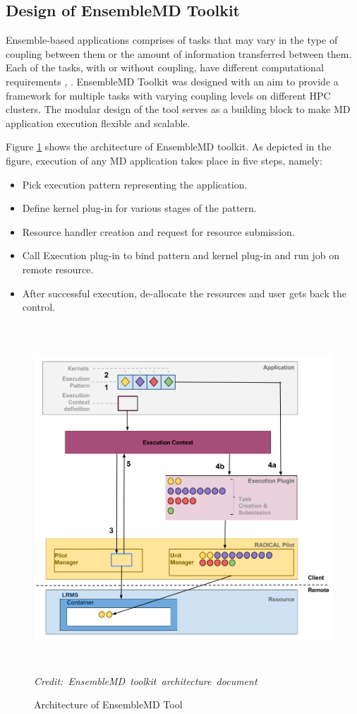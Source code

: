 \documentclass[10pt]{ruthesis}
\begin{document}
\subsection{Design of EnsembleMD Toolkit}
Ensemble-based applications comprises of tasks that may vary in the type of coupling between them or the amount of information transferred between them. Each of the tasks, with or without coupling, have different computational requirements \cite{ref2}, \cite{ref3}. EnsembleMD Toolkit was designed with an aim to provide a framework for multiple tasks with varying coupling levels on different HPC clusters. The modular design of the tool serves as a building block to make MD application execution flexible and scalable.

Figure \ref{fig:enmd_arch} \cite{site1} shows the architecture of EnsembleMD toolkit. As depicted in the figure, execution of any MD application takes place in five steps, namely:

\begin{itemize}
	\item Pick execution pattern representing the application.
	\item Define kernel plug-in for various stages of the pattern.
	\item Resource handler creation and request for resource submission.
	\item Call Execution plug-in to bind pattern and kernel plug-in and run job on remote resource.
	\item After successful execution, de-allocate the resources and user gets back the control.
\end{itemize}

\begin{figure}
  \centering
  \includegraphics[width=13cm,height=13cm]{enmdtk_arch.png}
  \hbox{\small\itshape Credit: EnsembleMD toolkit architecture document} \cite{site1}
  \caption{Architecture of EnsembleMD Tool}
  \label{fig:enmd_arch}
\end{figure}
\end{document}

